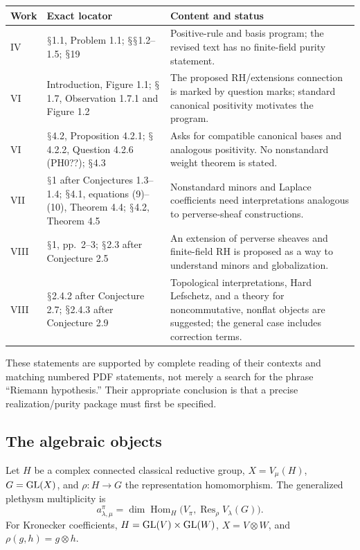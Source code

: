 \documentclass[11pt,a4paper]{article}
\newcommand{\Hom}{\operatorname{Hom}}\newcommand{\Spec}{\operatorname{Spec}}\newcommand{\Tr}{\operatorname{Tr}}\newcommand{\rank}{\operatorname{rank}}\newcommand{\Sym}{\operatorname{Sym}}\newcommand{\Res}{\operatorname{Res}}\newcommand{\IC}{\operatorname{IC}}\newcommand{\Gr}{\operatorname{Gr}}\newcommand{\Rep}{\operatorname{Rep}}\newcommand{\Frob}{\operatorname{Frob}}\newcommand{\End}{\operatorname{End}}
\renewcommand{\S}{\ensuremath{\mathsection}}
\theoremstyle{named}\newtheorem{finding}{Finding}[section]
\theoremstyle{definition}\newtheorem{definition}[finding]{Definition}
\theoremstyle{remark}\newtheorem{remark}[finding]{Remark}
\begin{document}
{\small\begin{longtable}{p{.13\linewidth}p{.35\linewidth}p{.44\linewidth}}
\toprule Work&Exact locator&Content and status\\\midrule\endhead
IV&\S1.1, Problem 1.1; \S\S1.2--1.5; \S19&Positive-rule and basis program; the revised text has no finite-field purity statement.\\
VI&Introduction, Figure 1.1; \S1.7, Observation 1.7.1 and Figure 1.2&The proposed RH/extensions connection is marked by question marks; standard canonical positivity motivates the program.\\
VI&\S4.2, Proposition 4.2.1; \S4.2.2, Question 4.2.6 (PH0??); \S4.3&Asks for compatible canonical bases and analogous positivity. No nonstandard weight theorem is stated.\\
VII&\S1 after Conjectures 1.3--1.4; \S4.1, equations (9)--(10), Theorem 4.4; \S4.2, Theorem 4.5&Nonstandard minors and Laplace coefficients need interpretations analogous to perverse-sheaf constructions.\\
VIII&\S1, pp.~2--3; \S2.3 after Conjecture 2.5&An extension of perverse sheaves and finite-field RH is proposed as a way to understand minors and globalization.\\
VIII&\S2.4.2 after Conjecture 2.7; \S2.4.3 after Conjecture 2.9&Topological interpretations, Hard Lefschetz, and a theory for noncommutative, nonflat objects are suggested; the general case includes correction terms.\\\bottomrule
\end{longtable}}
These statements are supported by complete reading of their contexts and matching numbered PDF statements, not merely a search for the phrase ``Riemann hypothesis.'' Their appropriate conclusion is that a precise realization/purity package must first be specified.

\subsection{The algebraic objects}
Let $H$ be a complex connected classical reductive group, $X=V_\mu(H)$, $G=\mathrm{GL}(X)$, and $\rho:H\to G$ the representation homomorphism. The generalized plethysm multiplicity is
\begin{equation}\label{eq:plethysm}
a_{\lambda,\mu}^{\pi}=\dim\Hom_H\bigl(V_\pi,\Res_\rho V_\lambda(G)\bigr).
\end{equation}
For Kronecker coefficients, $H=\mathrm{GL}(V)\times\mathrm{GL}(W)$, $X=V\otimes W$, and $\rho(g,h)=g\otimes h$.
\end{document}
